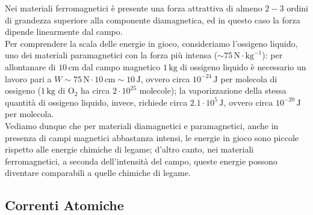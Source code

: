 \documentclass[]{article}
\begin{document}
Nei materiali ferromagnetici è presente una forza attrattiva di almeno $ 2-3 $ ordini di grandezza superiore alla componente diamagnetica, ed in questo caso la forza dipende linearmente dal campo. \\ 
%
Per comprendere la scala delle energie in gioco, consideriamo l'ossigeno liquido, uno dei materiali paramagnetici con la forza più intensa ($ \sim 75\,\text{N}\cdot\text{kg}^{-1} $): per allontanare di $ 10\,\text{cm} $ dal campo magnetico $ 1\,\text{kg} $ di ossigeno liquido è necessario un lavoro pari a $ W \sim 75 \,\text{N} \cdot 10\,\text{cm} \sim 10\,\text{J} $, ovvero circa $ 10^{-24}\,\text{J} $ per molecola di ossigeno ($ 1\,\text{kg} $ di $ \text{O}_2 $ ha circa $ 2\cdot 10^{25} $ molecole); la vaporizzazione della stessa quantità di ossigeno liquido, invece, richiede circa $ 2.1\cdot 10^5 \,\text{J} $, ovvero circa $ 10^{-20}\,\text{J} $ per molecola. \\ 
Vediamo dunque che per materiali diamagnetici e paramagnetici, anche in presenza di campi magnetici abbastanza intensi, le energie in gioco sono piccole rispetto alle energie chimiche di legame; d'altro canto, nei materiali ferromagnetici, a seconda dell'intensità del campo, queste energie possono diventare comparabili a quelle chimiche di legame.

\subsection{Correnti Atomiche}
\end{document}
